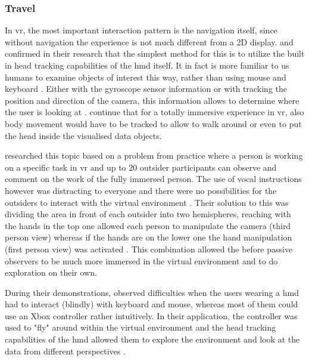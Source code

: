 
\subsubsection{Travel}

In \gls{vr}, the most important interaction pattern is the navigation itself, since without navigation the experience is not much different from a 2D display. \cite{Kwon2015} and \cite{Jamieson2007} confirmed in their research that the simplest method for this is to utilize the built in head tracking capabilities of the \gls{hmd} itself. It in fact is more familiar to us humans to examine objects of interest this way, rather than using mouse and keyboard \citep{Jamieson2007}. Either with the gyroscope sensor information or with tracking the position and direction of the camera, this information allows to determine where the user is looking at \citep{Kwon2015}. \cite{Jamieson2007} continue that for a totally immersive experience in \gls{vr}, also body movement would have to be tracked to allow to walk around or even to put the head inside the visualised data objects.

\cite{Deligiannidis2003} researched this topic based on a problem from practice where a person is working on a specific task in \gls{vr} and up to 20 outsider participants can observe and comment on the work of the fully immersed person. The use of vocal instructions however was distracting to everyone and there were no possibilities for the outsiders to interact with the virtual environment \citep{Deligiannidis2003}. Their solution to this was dividing the area in front of each outsider into two hemispheres, reaching with the hands in the top one allowed each person to manipulate the camera (third person view) whereas if the hands are on the lower one the hand manipulation (first person view) was activated \citep{Deligiannidis2003}. This combination allowed the before passive observers to be much more immersed in the virtual environment and to do exploration on their own.

During their demonstrations, \cite{Drouhard2015} observed difficulties when the users wearing a \gls{hmd} had to interact (blindly) with keyboard and mouse, whereas most of them could use an Xbox controller rather intuitively. In their application, the controller was used to "fly" around within the virtual environment and the head tracking capabilities of the \gls{hmd} allowed them to explore the environment and look at the data from different perspectives \citep{Drouhard2015}.

